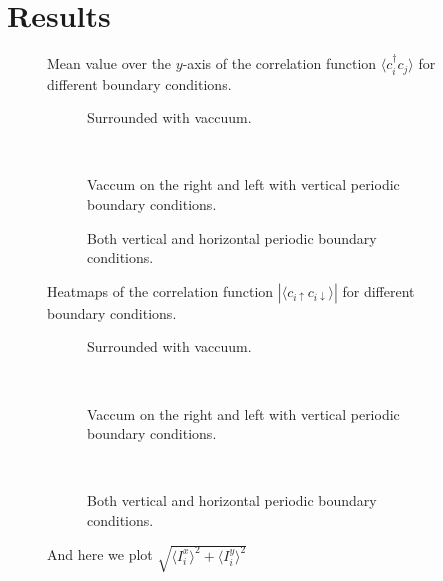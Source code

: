 \documentclass[..\main.tex]{subfile}
\begin{document}
\section{Results}
\begin{figure}[H]
    \centering
    
    \caption{Mean value over the $y$-axis of the correlation function $\langle c^\dagger_i c_j\rangle$ for different boundary conditions.}
\end{figure}
   
\begin{figure}[H]
    \centering
    \begin{subfigure}{0.3\textwidth}
        \centering
        
        \caption{Surrounded with vaccuum.}
        \label{fig:first}
    \end{subfigure}\\
    \begin{subfigure}{0.45\textwidth}
        \centering
        
        \caption{Vaccum on the right and left with vertical periodic boundary conditions.}
        \label{fig:first}
    \end{subfigure}
    \begin{subfigure}{0.45\textwidth}
        \centering
        
        \caption{Both vertical and horizontal periodic boundary conditions.}
        \label{fig:first}
    \end{subfigure}
    \caption{Heatmaps of the correlation function $|\langle c_{i\uparrow} c_{i\downarrow}\rangle|$ for different boundary conditions.}
\end{figure}



\begin{figure}[H]
    \centering
    \begin{subfigure}{0.45\textwidth}
        \centering
        

        \caption{Surrounded with vaccuum.}
        \label{fig:first}
    \end{subfigure}\\
    \begin{subfigure}{0.45\textwidth}
        \centering
        
        \caption{Vaccum on the right and left with vertical periodic boundary conditions.}
        \label{fig:first}
    \end{subfigure}\\
    \begin{subfigure}{0.45\textwidth}
        \centering
        
        \caption{Both vertical and horizontal periodic boundary conditions.}
        \label{fig:first}
    \end{subfigure}
    \caption{And here we plot $\sqrt{\langle I^x_i\rangle^2 + \langle I^y_i\rangle^2}$}
\end{figure}
\end{document}
